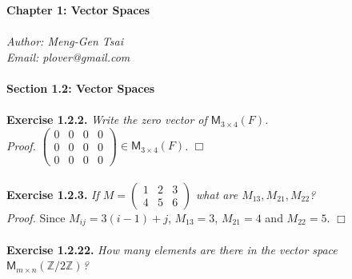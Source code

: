\documentclass{article}
\begin{document}
\textbf{\Large Chapter 1: Vector Spaces} \\\\



\emph{Author: Meng-Gen Tsai} \\
\emph{Email: plover@gmail.com} \\\\






\textbf{\large Section 1.2: Vector Spaces} \\\\



\textbf{Exercise 1.2.2.}
\emph{Write the zero vector of $\mathsf{M}_{3 \times 4}(F)$.} \\

\emph{Proof.}
$\begin{pmatrix}
0 & 0 & 0 & 0 \\
0 & 0 & 0 & 0 \\
0 & 0 & 0 & 0
\end{pmatrix} \in \mathsf{M}_{3 \times 4}(F)$.
$\Box$ \\\\






\textbf{Exercise 1.2.3.}
\emph{If
$M =
  \begin{pmatrix}
  1 & 2 & 3 \\
  4 & 5 & 6
  \end{pmatrix}$
what are $M_{13}, M_{21}, M_{22}$?} \\

\emph{Proof.}
Since $M_{ij} = 3(i-1) + j$, $M_{13} = 3$, $M_{21} = 4$ and $M_{22} = 5$.
$\Box$ \\\\






\textbf{Exercise 1.2.22.}
\emph{How many elements are there in the vector space
$\mathsf{M}_{m \times n}(\mathbb{Z}/2\mathbb{Z})$?} \\
\end{document}

